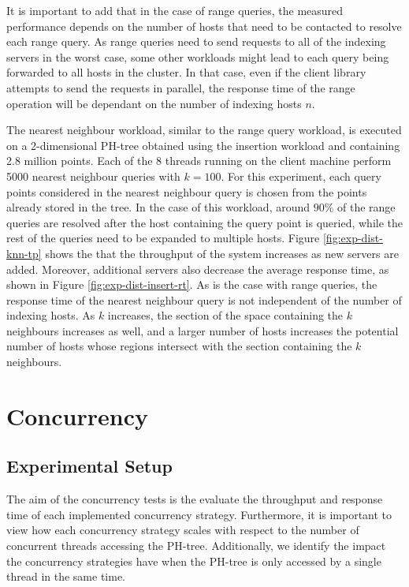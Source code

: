 \documentclass[11pt,a4paper]{globis-book}
\begin{document}
It is important to add that in the case of range queries, the measured performance depends on the number of hosts that need to be contacted to resolve each range query. As range queries need to send requests to all of the indexing servers in the worst case, some other workloads might lead to each query being forwarded to all hosts in the cluster. In that case, even if the client library attempts to send the requests in parallel, the response time of the range operation will be dependant on the number of indexing hosts $n$. 

The nearest neighbour workload, similar to the range query workload, is executed on a 2-dimensional PH-tree obtained using the insertion workload and containing 2.8 million points. Each of the 8 threads running on the client machine perform 5000 nearest neighbour queries with $k = 100$. For this experiment, each query points considered in the nearest neighbour query is chosen from the points already stored in the tree. In the case of this workload, around $90\%$ of the range queries are resolved after the host containing the query point is queried, while the rest of the queries need to be expanded to multiple hosts. Figure \ref{fig:exp-dist-knn-tp} shows the that the throughput of the system increases as new servers are added. Moreover, additional servers also decrease the average response time, as shown in Figure \ref{fig:exp-dist-insert-rt}. As is the case with range queries, the response time of the nearest neighbour query is not independent of the number of indexing hosts. As $k$ increases, the section of the space containing the $k$ neighbours increases as well, and a larger number of hosts increases the potential number of hosts whose regions intersect with the section containing the $k$ neighbours. 

\section{Concurrency}
\label{sec:evaluation-concurrency}

\subsection{Experimental Setup}
\label{subsec:exp-conc}
The aim of the concurrency tests is the evaluate the throughput and response time of each implemented concurrency strategy. Furthermore, it is important to view how each concurrency strategy scales with respect to the number of concurrent threads accessing the PH-tree. Additionally, we identify the impact the concurrency strategies have when the PH-tree is only accessed by a single thread in the same time.
\end{document}
